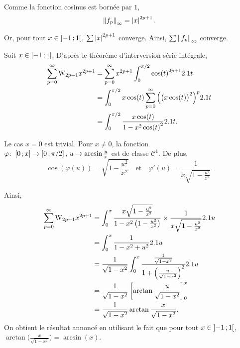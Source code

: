 \begin{solution}
\begin{reponses}
\item Comme la fonction cosinus est bornée par $1$,
\[
\norm{f_p}_{\infty} = \module{x}^{2p+1}.
\]

Or, pour tout $x \in \interoo{-1}{1}$, $\sum \module{x}^{2p+1}$ converge. Ainsi, $\sum \norm{f_p}_{\infty}$ converge.

\item Soit $x \in \interoo{-1}{1}$. D'après le théorème d'interversion série intégrale,
\begin{align*}
\sum_{p=0}^\infty \Wallis_{2p+1} x^{2p+1}
&= \sum_{p=0}^\infty x^{2p+1} \int_0^{\pi/2} \cos(t)^{2p+1} \d t\\
&= \int_0^{\pi/2} x\cos(t) \sum_{p=0}^\infty \Big(\big(x\cos(t) \big)^2 \Big)^p \d t \\
&= \int_0^{\pi/2} \frac{x \cos(t)}{1 - x^2 \cos(t)^2} \d t.
\end{align*}

\item Le cas $x = 0$ est trivial. Pour $x \neq 0$, la fonction $\fonctionens[\varphi]{\interff{0}{x}}{\interff{0}{\pi/2}},\, u \mapsto \arcsin\frac{u}{x}$ est de classe $\mathscr{C}^1$. De plus,
\[
\cos(\varphi(u)) = \sqrt{1 - \frac{u^2}{x^2}}
\quad \text{et} \quad 
\varphi'(u) = \frac{1}{x \sqrt{1 - \frac{u^2}{x^2}}}.
\]

Ainsi,
\begin{align*}
\sum_{p=0}^\infty \Wallis_{2p+1} x^{2p+1}
&= \int_0^x \frac{x \sqrt{1 - \frac{u^2}{x^2}}}{1 - x^2 \left(1 - \frac{u^2}{x^2}\right)} \times \frac{1}{x \sqrt{1 - \frac{u^2}{x^2}}}\d u \\
&= \int_0^x \frac{1}{1 - x^2 + u^2} \d u\\
&= \frac{1}{\sqrt{1 - x^2}} \int_0^x \frac{\frac{1}{\sqrt{1 - x^2}}}{1 + \left(\frac{u}{\sqrt{1-x^2}}\right)^2} \d u \\
&= \frac{1}{\sqrt{1 - x^2}} \left[ \arctan \frac{u}{\sqrt{1 - x^2}} \right]^x_0 \\
&= \frac{1}{\sqrt{1 - x^2}} \arctan \frac{x}{\sqrt{1 - x^2}}.
\end{align*}
On obtient le résultat annoncé en utilisant le fait que pour tout $x \in \interoo{-1}{1}$, $\arctan\mathopen{}\Big(\frac{x}{\sqrt{1-x^2}} \Big) = \arcsin(x)$.
\marginnote[-5cm]{

}


\end{reponses}
\end{solution}
